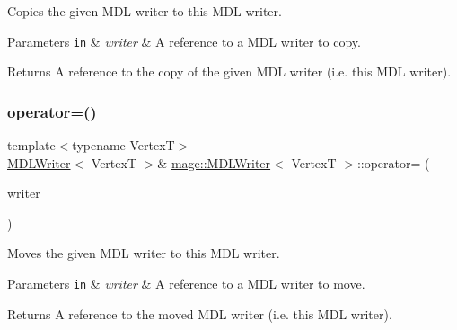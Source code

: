 Copies the given M\+DL writer to this M\+DL writer.


\begin{DoxyParams}[1]{Parameters}
\mbox{\tt in}  & {\em writer} & A reference to a M\+DL writer to copy. \\
\hline
\end{DoxyParams}
\begin{DoxyReturn}{Returns}
A reference to the copy of the given M\+DL writer (i.\+e. this M\+DL writer). 
\end{DoxyReturn}
\hypertarget{classmage_1_1_m_d_l_writer_ac2da6334ef4c6c10af7ce5e94ee46dd1}{}\label{classmage_1_1_m_d_l_writer_ac2da6334ef4c6c10af7ce5e94ee46dd1} 
\subsubsection{\texorpdfstring{operator=()}{operator=()}\hspace{0.1cm}{\footnotesize\ttfamily [2/2]}}
{\footnotesize\ttfamily template$<$typename VertexT$>$ \\
\hyperlink{classmage_1_1_m_d_l_writer}{M\+D\+L\+Writer}$<$ VertexT $>$\& \hyperlink{classmage_1_1_m_d_l_writer}{mage\+::\+M\+D\+L\+Writer}$<$ VertexT $>$\+::operator= (\begin{DoxyParamCaption}\item[{\hyperlink{classmage_1_1_m_d_l_writer}{M\+D\+L\+Writer}$<$ VertexT $>$ \&\&}]{writer }\end{DoxyParamCaption})\hspace{0.3cm}{\ttfamily [delete]}}

Moves the given M\+DL writer to this M\+DL writer.


\begin{DoxyParams}[1]{Parameters}
\mbox{\tt in}  & {\em writer} & A reference to a M\+DL writer to move. \\
\hline
\end{DoxyParams}
\begin{DoxyReturn}{Returns}
A reference to the moved M\+DL writer (i.\+e. this M\+DL writer). 
\end{DoxyReturn}
\hypertarget{classmage_1_1_m_d_l_writer_aa326a70b449baae2d7db8043e2731327}{}\label{classmage_1_1_m_d_l_writer_aa326a70b449baae2d7db8043e2731327} 
